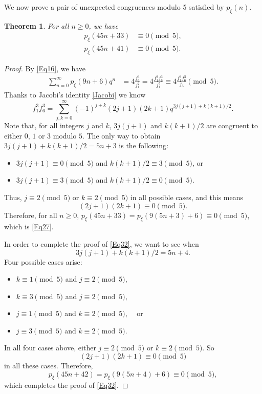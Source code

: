 \documentclass[12pt]{article}
\newtheorem{theorem}{Theorem}[section]
\begin{document}
We now prove a pair of unexpected congruences modulo 5 satisfied by $p_{\xi}(n).$  		
\begin{theorem} For all $n \geq 0$, we have
\begin{align}
p_{\xi}(45n+33) & \equiv 0 \pmod{5}, \label{Eq27} \\
p_{\xi}(45n+41) & \equiv 0 \pmod{5}. \label{Eq32}
\end{align}
\end{theorem}

\begin{proof}
By \eqref{Eq16}, we have
\begin{align*}
\sum_{n=0}^{\infty} p_{\xi}(9n+6)q^{n} & = 4\frac{f_{6}^3}{f_{1}^2} = 4\frac{f_1^3f_{6}^3}{f_{1}^5} \equiv 4\frac{f_1^3f_{6}^3}{f_{5}} \pmod{5}.
\end{align*}
Thanks to Jacobi's identity \eqref{Jacobi} we know
$$f_1^3f_6^3 = \sum_{j,k=0}^{\infty} (-1)^{j+k} (2j+1)(2k+1) q^{3j(j+1)+k(k+1)/2}.$$
Note that, for all integers $j$ and $k$, $3j(j+1)$ and $k(k+1)/2$ are congruent to either $0$, $1$ or $3$ modulo $5$. The only way to obtain $3j(j+1)+k(k+1)/2 = 5n+3$ is the following:
\begin{itemize}
	\item $3j(j+1) \equiv 0 \pmod{5}$ and $k(k+1)/2 \equiv 3 \pmod{5}$, or
	\item $3j(j+1) \equiv 3 \pmod{5}$ and $k(k+1)/2 \equiv 0 \pmod{5}$.
\end{itemize}
Thus, $j \equiv 2 \pmod{5}$ or $k \equiv 2 \pmod{5}$ in all possible cases, and this means 
$$(2j+1)(2k+1) \equiv 0 \pmod{5}.$$
Therefore, for all $n \geq 0$, $p_{\xi}(45n+33) = p_{\xi}(9(5n+3)+6) \equiv 0 \pmod{5}$, which is \eqref{Eq27}.

In order to complete the proof of \eqref{Eq32}, we want to see when $$3j(j+1)+k(k+1)/2 = 5n+4.$$ Four possible cases arise:
\begin{itemize}
	\item $k \equiv 1 \pmod{5}$ and $j \equiv 2 \pmod{5}$,
	\item $k \equiv 3 \pmod{5}$ and $j \equiv 2 \pmod{5}$,
	\item $j \equiv 1 \pmod{5}$ and $k \equiv 2 \pmod{5}$, \textrm{\ \ or}
	\item $j \equiv 3 \pmod{5}$ and $k \equiv 2 \pmod{5}$.
\end{itemize}
In all four cases above, either $j \equiv 2 \pmod{5}$ or $k \equiv 2 \pmod{5}$. So $$(2j+1)(2k+1) \equiv 0 \pmod{5}$$ in all these cases. Therefore, $$p_{\xi}(45n+42) = p_{\xi}(9(5n+4)+6) \equiv 0 \pmod{5},$$ which completes the proof of \eqref{Eq32}.
\end{proof}
		
\end{document}
